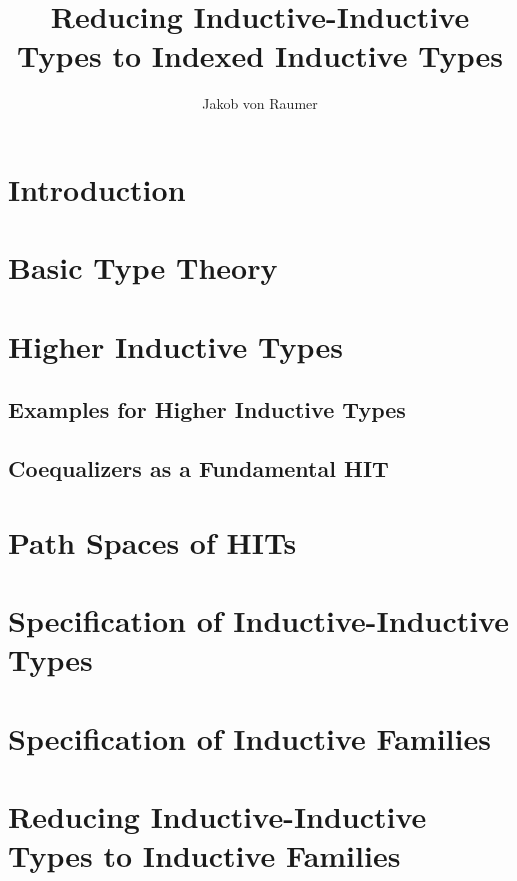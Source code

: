 \documentclass[12pt,headings=optiontohead,openany,oneside,a4paper]{book}
\theoremstyle{definition}
\begin{document}
\title{Reducing Inductive-Inductive Types to Indexed Inductive Types}
\author{Jakob von Raumer}

\frontmatter
\maketitle

\tableofcontents

\mainmatter

\chapter{Introduction}



\chapter{Basic Type Theory}

\chapter{Higher Inductive Types}

\section{Examples for Higher Inductive Types}

\section{Coequalizers as a Fundamental HIT}

\chapter{Path Spaces of HITs}

\chapter{Specification of Inductive-Inductive Types}


%

\chapter{Specification of Inductive Families}



\chapter{Reducing Inductive-Inductive Types to Inductive Families}





\end{document}
